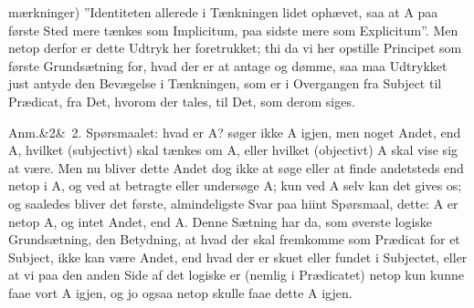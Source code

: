 \documentclass[12pt]{book}
\def\sperr#1{#1}%
\def\textit#1{#1}%
\newcommand{\sperr}[1]{\textls[180]{#1}}
\newcommand{\anm}[1]{%
  \par\vspace{0.5\baselineskip}%
  \noindent\hspace{\parindent}\sperr{Anm.}\ifx&#1&\else~\textit{#1}.\fi
  \enspace\ignorespaces
}
\newcommand{\opage}[1]{\marginnote{\footnotesize\textit{[#1]}}}
\begin{document}
\opage{313}mærkninger) ''Identiteten allerede i Tænkningen lidet ophævet, saa at
\textit{A} paa første Sted mere tænkes som Implicitum, paa sidste mere som
Explicitum''. Men netop derfor er dette Udtryk her foretrukket; thi da vi her
opstille Principet som første Grundsætning for, hvad der er at antage og dømme,
saa maa Udtrykket just antyde den Bevægelse i Tænkningen, som er i Overgangen
fra Subject til Prædicat, fra Det, hvorom der tales, til Det, som derom siges.

\anm{2} Spørsmaalet: hvad er \textit{A}? søger ikke \textit{A} igjen, men noget
Andet, end \textit{A}, hvilket (subjectivt) skal tænkes om \textit{A}, eller
hvilket (objectivt) \textit{A} skal vise sig at være. Men nu bliver dette Andet
dog ikke at søge eller at finde andetsteds end netop i \textit{A}, og ved at
betragte eller undersøge \textit{A}; kun ved \textit{A} selv kan det gives os;
og saaledes bliver det første, almindeligste Svar paa hiint Spørsmaal, dette:
\textit{A} er netop \textit{A}, og intet Andet, end \textit{A}. Denne Sætning
har da, som øverste logiske Grundsætning, den Betydning, at hvad der skal
fremkomme som Prædicat for et Subject, ikke kan være Andet, end hvad der er
skuet eller fundet i Subjectet, eller at vi paa den anden Side af det logiske er
(nemlig i Prædicatet) netop kun kunne faae vort \textit{A} igjen, og jo ogsaa
netop skulle faae dette \textit{A} igjen.
\end{document}
